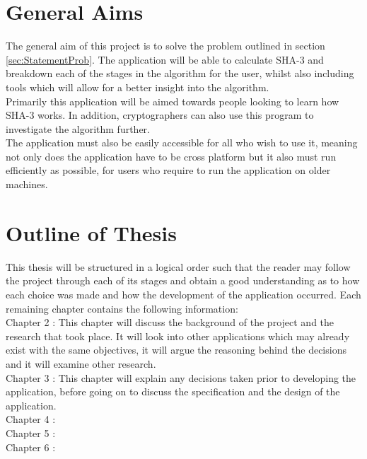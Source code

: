 \section{General Aims}
The general aim of this project is to solve the problem outlined in section \ref{sec:StatementProb}. The application will be able to calculate SHA-3 and breakdown each of the stages in the algorithm for the user, whilst also including tools which will allow for a better insight into the algorithm.
\vspace{5 mm}\\
Primarily this application will be aimed towards people looking to learn how SHA-3 works. In addition, cryptographers can also use this program to investigate the algorithm further. 
\vspace{5 mm}\\
The application must also be easily accessible for all who wish to use it, meaning not only does the application have to be cross platform but it also must run efficiently as possible, for users who require to run the application on older machines.
\section{Outline of Thesis}
This thesis will be structured in a logical order such that the reader may follow the project through each of its stages and obtain a good understanding as to how each choice was made and how the development of the application occurred. Each remaining chapter contains the following information:
\vspace{5 mm}\\
Chapter 2 : This chapter will discuss the background of the project and the research that took place. It will look into other applications which may already exist with the same objectives, it will argue the reasoning behind the decisions and it will examine other research.
\vspace{5 mm}\\
Chapter 3 : This chapter will explain any decisions taken prior to developing the application, before going on to discuss the specification and the design of the application.
\vspace{5 mm}\\
Chapter 4 :
\vspace{5 mm}\\
Chapter 5 :
\vspace{5 mm}\\
Chapter 6 :